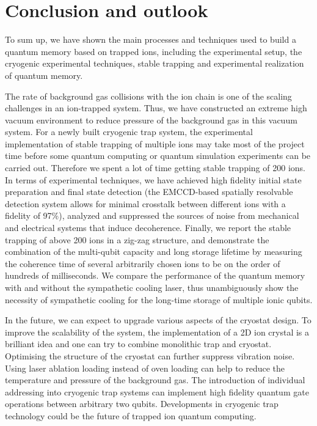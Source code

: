 
\chapter{Conclusion and outlook}
\label{chap:conclusion_and_outlook}

To sum up, we have shown the main processes and techniques used to build a quantum memory based on trapped ions, including the experimental setup, the cryogenic experimental techniques, stable trapping and experimental realization of quantum memory.

The rate of background gas collisions with the ion chain is one of the scaling challenges in an ion-trapped system. Thus, we have constructed an extreme high vacuum environment to reduce pressure of the background gas in this vacuum system. For a newly built cryogenic trap system, the experimental implementation of stable trapping of multiple ions may take most of the project time before some quantum computing or quantum simulation experiments can be carried out. Therefore we spent a lot of time getting stable trapping of 200 ions. In terms of experimental techniques, we have achieved high fidelity initial state preparation and final state detection (the EMCCD-based spatially resolvable detection system allows for minimal crosstalk between different ions with a fidelity of 97\%), analyzed and suppressed the sources of noise from mechanical and electrical systems that induce decoherence. Finally, we report the stable trapping of above 200 ions in a zig-zag structure, and demonstrate the combination of the multi-qubit capacity and long storage lifetime by measuring the coherence time of several arbitrarily chosen ions to be on the order of hundreds of milliseconds. We compare the performance of the quantum memory with and without the sympathetic cooling laser, thus unambiguously show the necessity of sympathetic cooling for the long-time storage of multiple ionic qubits.

In the future, we can expect to upgrade various aspects of the cryostat design. To improve the scalability of the system, the implementation of a 2D ion crystal is a brilliant idea and one can try to combine monolithic trap and cryostat. Optimising the structure of the cryostat can further suppress vibration noise. Using laser ablation loading instead of oven loading can help to reduce the temperature and pressure of the background gas. The introduction of individual addressing into cryogenic trap systems can implement high fidelity quantum gate operations between arbitrary two qubits. Developments in cryogenic trap technology could be the future of trapped ion quantum computing.
